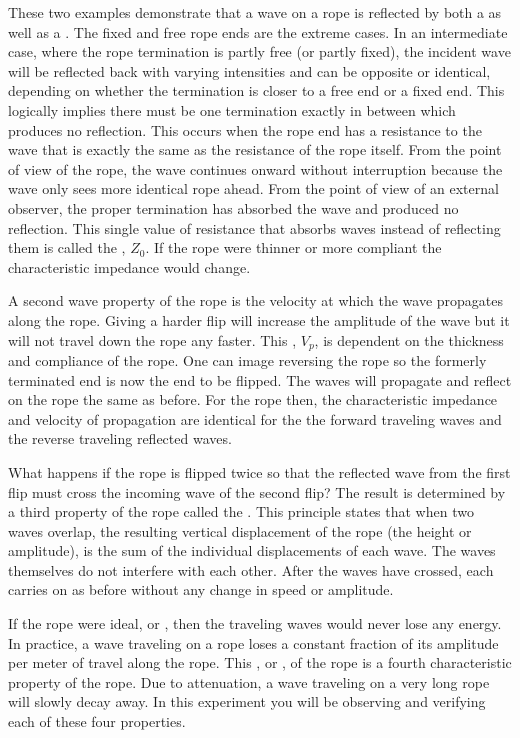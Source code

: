 \noindent These two examples demonstrate that a wave on a rope is reflected by both a  as well as a . The fixed and free rope ends are the extreme cases. In an intermediate case, where the rope termination is partly free (or partly fixed), the incident wave will be reflected back with varying intensities and can be opposite or identical, depending on whether the termination is closer to a free end or a fixed end. This logically implies there must be one termination exactly in between which produces no reflection. This  occurs when the rope end has a resistance to the wave that is exactly the same as the resistance of the rope itself. From the point of view of the rope, the wave continues onward without interruption because the wave only sees more identical rope ahead. From the point of view of an external observer, the proper termination has absorbed the wave and produced no reflection. This single value of resistance that absorbs waves instead of reflecting them is called the , $Z_0$. If the rope were thinner or more compliant the characteristic impedance would change.


\noindent A second wave property of the rope is the velocity at which the wave propagates along the rope. Giving a harder flip will increase the amplitude of the wave but it will not travel down the rope any faster. This , $V_p$, is dependent on the thickness and compliance of the rope. One can image reversing the rope so the formerly terminated end is now the end to be flipped. The waves will propagate and reflect on the rope the same as before. For the rope then, the characteristic impedance and velocity of propagation are identical for the the forward traveling waves and the reverse traveling reflected waves.

\noindent What happens if the rope is flipped twice so that the reflected wave from the first flip must cross the incoming wave of the second flip? The result is determined by a third property of the rope called the . This principle states that when two waves overlap, the resulting vertical displacement of the rope (the height or amplitude), is the sum of the individual displacements of each wave. The waves themselves do not interfere with each other. After the waves have crossed, each carries on as before without any change in speed or amplitude.

\noindent If the rope were ideal, or , then the traveling waves would never lose any energy. In practice, a wave traveling on a rope loses a constant fraction of its amplitude per meter of travel along the rope. This , or , of the rope is a fourth characteristic property of the rope. Due to attenuation, a wave traveling on a very long rope will slowly decay away. In this experiment you will be observing and verifying each of these four properties.

